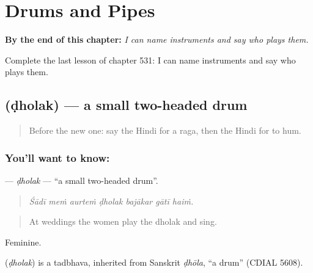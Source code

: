 
\chapter{Drums and Pipes}
\label{ch:hi-drums-and-pipes}

\begin{chapteropening}
\textbf{By the end of this chapter:} \emph{I can name instruments and say who plays them.}

Complete the last lesson of chapter 531: I can name instruments and say who plays them.
\end{chapteropening}

\section[\texorpdfstring{\hi{ढोलक} (ḍholak)}{ढोलक (ḍholak)}]{ (ḍholak) — a small two-headed drum}

\label{lesson:HI-C531-dholak}



\begin{quote}
Before the new one: say the Hindi for a raga, then the Hindi for to hum.
\end{quote}

\subsection*{You'll want to know: }
\textbf{} — \emph{ḍholak} — \textquotedblleft{}a small two-headed drum\textquotedblright{}.

\begin{quote}
      
\end{quote}

\begin{quote}
\emph{Śādī meṁ aurteṁ ḍholak bajākar gātī haiṁ.}
\end{quote}

\begin{quote}
At weddings the women play the dholak and sing.
\end{quote}

Feminine.

\begin{cousinweb}
\textbf{} (\emph{ḍholak}) is a tadbhava, inherited from Sanskrit \emph{ḍhōla}, \textquotedblleft{}a drum\textquotedblright{} (CDIAL 5608).
\end{cousinweb}

